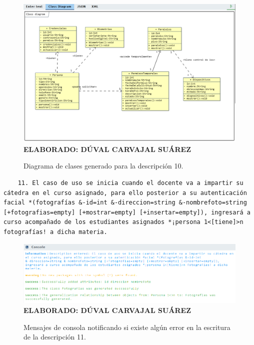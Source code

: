 \begin{figure}[H]
	\caption{Diagrama de clases generado para la descripción 10.}
	\includegraphics[width=15cm]{img/dc-eva-010.png}
	\label{fig:dc_eva_010}
	\textbf{\\ ELABORADO: DÚVAL CARVAJAL SUÁREZ}
\end{figure}

\begin{lstlisting}
	11. El caso de uso se inicia cuando el docente va a impartir su cátedra en el curso asignado, para ello posterior a su autenticación facial *(fotografías &-id=int &-direccion=string &-nombrefoto=string [+fotografias=empty] [+mostrar=empty] [+insertar=empty]), ingresará a curso acompañado de los estudiantes asignados *¡persona 1<[tiene]>n fotografías! a dicha materia.
\end{lstlisting}

     \begin{figure}[h!]
	\caption{Mensajes de consola notificando si existe algún error en la escritura de la descripción 11.}
	\includegraphics[width=14cm]{img/not-eva-011.png}
	\label{fig:not_eva_011}
	\textbf{\\ ELABORADO: DÚVAL CARVAJAL SUÁREZ}
\end{figure}


